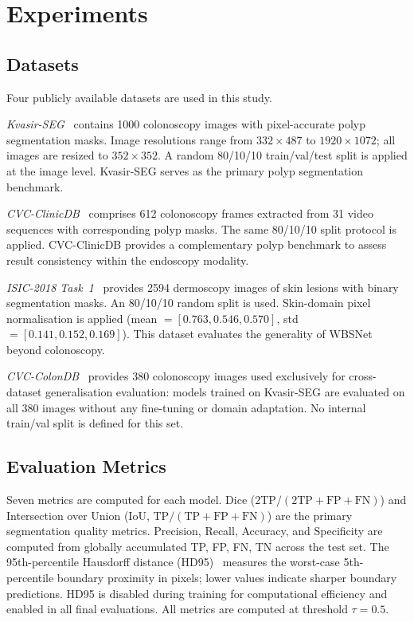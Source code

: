 \documentclass[journal]{IEEEtran}
\begin{document}
\section{Experiments}\label{sec:experiments}

\subsection{Datasets}\label{sec:exp:datasets}

Four publicly available datasets are used in this study.

\textit{Kvasir-SEG}~\cite{jha2020kvasir} contains 1000 colonoscopy images
with pixel-accurate polyp segmentation masks.
Image resolutions range from $332 \times 487$ to $1920 \times 1072$;
all images are resized to $352 \times 352$.
A random 80/10/10 train/val/test split is applied at the image level.
Kvasir-SEG serves as the primary polyp segmentation benchmark.

\textit{CVC-ClinicDB}~\cite{bernal2015cvc} comprises 612 colonoscopy frames
extracted from 31 video sequences with corresponding polyp masks.
The same 80/10/10 split protocol is applied.
CVC-ClinicDB provides a complementary polyp benchmark to assess
result consistency within the endoscopy modality.

\textit{ISIC-2018 Task~1}~\cite{codella2019isic} provides 2594 dermoscopy
images of skin lesions with binary segmentation masks.
An 80/10/10 random split is used.
Skin-domain pixel normalisation is applied (mean $= [0.763, 0.546, 0.570]$,
std $= [0.141, 0.152, 0.169]$).
This dataset evaluates the generality of WBSNet beyond colonoscopy.

\textit{CVC-ColonDB}~\cite{tajbakhsh2015colondb} provides 380 colonoscopy
images used exclusively for cross-dataset generalisation evaluation:
models trained on Kvasir-SEG are evaluated on all 380 images without any
fine-tuning or domain adaptation.
No internal train/val split is defined for this set.

\subsection{Evaluation Metrics}\label{sec:exp:metrics}

Seven metrics are computed for each model.
Dice ($2\text{TP}/(2\text{TP}+\text{FP}+\text{FN})$) and Intersection over
Union (IoU, $\text{TP}/(\text{TP}+\text{FP}+\text{FN})$) are the primary
segmentation quality metrics.
Precision, Recall, Accuracy, and Specificity are computed from globally
accumulated TP, FP, FN, TN across the test set.
The 95th-percentile Hausdorff distance (HD95)~\cite{aydin2021hd95} measures
the worst-case 5th-percentile boundary proximity in pixels; lower values
indicate sharper boundary predictions.
HD95 is disabled during training for computational efficiency and enabled in
all final evaluations.
All metrics are computed at threshold $\tau = 0.5$.
\end{document}
